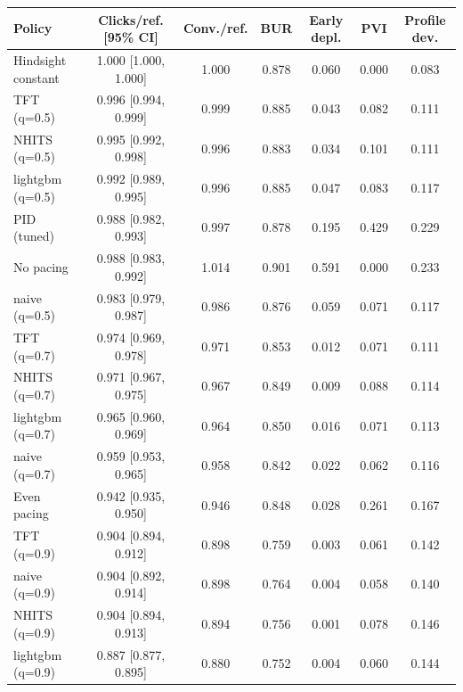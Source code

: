 \begin{tabular}{lcccccc}
\toprule
Policy & Clicks/ref. [95\% CI] & Conv./ref. & BUR & Early depl. & PVI & Profile dev. \\
\midrule
Hindsight constant & 1.000 [1.000, 1.000] & 1.000 & 0.878 & 0.060 & 0.000 & 0.083 \\
TFT (q=0.5) & 0.996 [0.994, 0.999] & 0.999 & 0.885 & 0.043 & 0.082 & 0.111 \\
NHITS (q=0.5) & 0.995 [0.992, 0.998] & 0.996 & 0.883 & 0.034 & 0.101 & 0.111 \\
lightgbm (q=0.5) & 0.992 [0.989, 0.995] & 0.996 & 0.885 & 0.047 & 0.083 & 0.117 \\
PID (tuned) & 0.988 [0.982, 0.993] & 0.997 & 0.878 & 0.195 & 0.429 & 0.229 \\
No pacing & 0.988 [0.983, 0.992] & 1.014 & 0.901 & 0.591 & 0.000 & 0.233 \\
naive (q=0.5) & 0.983 [0.979, 0.987] & 0.986 & 0.876 & 0.059 & 0.071 & 0.117 \\
TFT (q=0.7) & 0.974 [0.969, 0.978] & 0.971 & 0.853 & 0.012 & 0.071 & 0.111 \\
NHITS (q=0.7) & 0.971 [0.967, 0.975] & 0.967 & 0.849 & 0.009 & 0.088 & 0.114 \\
lightgbm (q=0.7) & 0.965 [0.960, 0.969] & 0.964 & 0.850 & 0.016 & 0.071 & 0.113 \\
naive (q=0.7) & 0.959 [0.953, 0.965] & 0.958 & 0.842 & 0.022 & 0.062 & 0.116 \\
Even pacing & 0.942 [0.935, 0.950] & 0.946 & 0.848 & 0.028 & 0.261 & 0.167 \\
TFT (q=0.9) & 0.904 [0.894, 0.912] & 0.898 & 0.759 & 0.003 & 0.061 & 0.142 \\
naive (q=0.9) & 0.904 [0.892, 0.914] & 0.898 & 0.764 & 0.004 & 0.058 & 0.140 \\
NHITS (q=0.9) & 0.904 [0.894, 0.913] & 0.894 & 0.756 & 0.001 & 0.078 & 0.146 \\
lightgbm (q=0.9) & 0.887 [0.877, 0.895] & 0.880 & 0.752 & 0.004 & 0.060 & 0.144 \\
\bottomrule
\end{tabular}